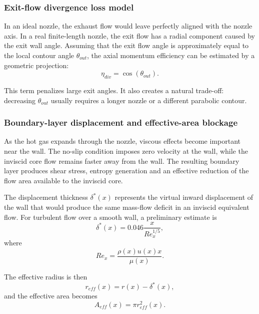 \documentclass[11pt,a4paper]{article}
\begin{document}
\subsubsection{Exit-flow divergence loss model}

In an ideal nozzle, the exhaust flow would leave perfectly aligned with the nozzle axis. In a real finite-length nozzle, the exit flow has a radial component caused by the exit wall angle. Assuming that the exit flow angle is approximately equal to the local contour angle $\theta_{out}$, the axial momentum efficiency can be estimated by a geometric projection:
\begin{equation}
\boxed{\eta_{div}=\cos(\theta_{out})}.
\label{eq:eta_div}
\end{equation}

This term penalizes large exit angles. It also creates a natural trade-off: decreasing $\theta_{out}$ usually requires a longer nozzle or a different parabolic contour.

\subsubsection{Boundary-layer displacement and effective-area blockage}

As the hot gas expands through the nozzle, viscous effects become important near the wall. The no-slip condition imposes zero velocity at the wall, while the inviscid core flow remains faster away from the wall. The resulting boundary layer produces shear stress, entropy generation and an effective reduction of the flow area available to the inviscid core.

The displacement thickness $\delta^*(x)$ represents the virtual inward displacement of the wall that would produce the same mass-flow deficit in an inviscid equivalent flow. For turbulent flow over a smooth wall, a preliminary estimate is
\begin{equation}
\delta^*(x)=0.046\frac{x}{Re_x^{1/5}},
\label{eq:delta_star}
\end{equation}
where
\begin{equation}
Re_x=\frac{\rho(x)u(x)x}{\mu(x)}.
\label{eq:Rex}
\end{equation}

The effective radius is then
\begin{equation}
r_{eff}(x)=r(x)-\delta^*(x),
\label{eq:reff}
\end{equation}
and the effective area becomes
\begin{equation}
A_{eff}(x)=\pi r_{eff}^2(x).
\label{eq:Aeff}
\end{equation}
\end{document}

